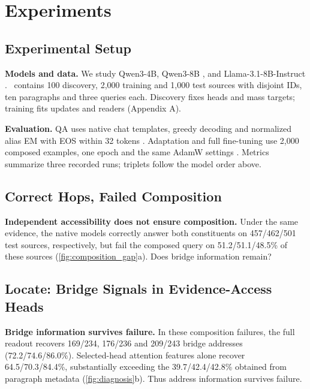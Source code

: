 \section{Experiments}\label{sec:experiments}
\subsection{Experimental Setup}\label{sec:setup}
\textbf{Models and data.} We study Qwen3-4B, Qwen3-8B \citep{yang2025qwen3}, and Llama-3.1-8B-Instruct \citep{grattafiori2024llama3}. \dataset\ contains 100 discovery, 2,000 training and 1,000 test sources with disjoint IDs, ten paragraphs and three queries each. Discovery fixes heads and mass targets; training fits updates and readers (Appendix A).

\textbf{Evaluation.} QA uses native chat templates, greedy decoding and normalized alias EM with EOS within 32 tokens \citep{alab2020twikievaluation}. Adaptation and full fine-tuning use 2,000 composed examples, one epoch and the same AdamW settings \citep{loshchilov2019adamw}. Metrics summarize three recorded runs; triplets follow the model order above.
\subsection{Correct Hops, Failed Composition}\label{sec:phenomenon}
\textbf{Independent accessibility does not ensure composition.} Under the same evidence, the native models correctly answer both constituents on 457/462/501 test sources, respectively, but fail the composed query on 51.2/51.1/48.5\% of these sources (\cref{fig:composition_gap}a). Does bridge information remain?
\subsection{Locate: Bridge Signals in Evidence-Access Heads}\label{sec:address_results}
\textbf{Bridge information survives failure.} In these composition failures, the full readout recovers 169/234, 176/236 and 209/243 bridge addresses (72.2/74.6/86.0\%). Selected-head attention features alone recover 64.5/70.3/84.4\%, substantially exceeding the 39.7/42.4/42.8\% obtained from paragraph metadata (\cref{fig:diagnosis}b). Thus address information survives failure.

